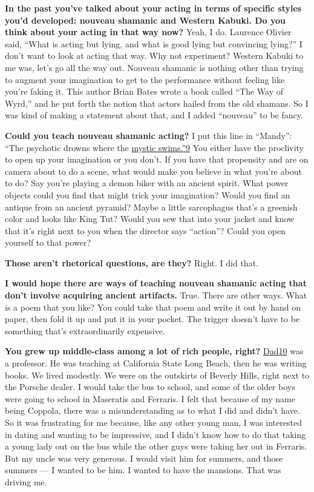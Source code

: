 \textbf{In the past you've talked about your acting in terms of specific
styles you'd developed: nouveau shamanic and Western Kabuki. Do you
think about your acting in that way now?} Yeah, I do. Laurence Olivier
said, ``What is acting but lying, and what is good lying but convincing
lying?'' I don't want to look at acting that way. Why not experiment?
Western Kabuki to me was, let's go all the way out. Nouveau shamanic is
nothing other than trying to augment your imagination to get to the
performance without feeling like you're faking it. This author Brian
Bates wrote a book called ``The Way of Wyrd,'' and he put forth the
notion that actors hailed from the old shamans. So I was kind of making
a statement about that, and I added ``nouveau'' to be fancy.

\textbf{Could you teach nouveau shamanic acting?} I put this line in
``Mandy'': ``The psychotic drowns where the
\href{http://nytimes3xbfgragh.onion\#tooltip-9}{mystic
swims.''}\href{http://nytimes3xbfgragh.onion\#tooltip-9}{9} You either
have the proclivity to open up your imagination or you don't. If you
have that propensity and are on camera about to do a scene, what would
make you believe in what you're about to do? Say you're playing a demon
biker with an ancient spirit. What power objects could you find that
might trick your imagination? Would you find an antique from an ancient
pyramid? Maybe a little sarcophagus that's a greenish color and looks
like King Tut? Would you sew that into your jacket and know that it's
right next to you when the director says ``action''? Could you open
yourself to that power?

\textbf{Those aren't rhetorical questions, are they?} Right. I did that.

\textbf{I would hope there are ways of teaching nouveau shamanic acting
that don't involve acquiring ancient artifacts.} True. There are other
ways. What is a poem that you like? You could take that poem and write
it out by hand on paper, then fold it up and put it in your pocket. The
trigger doesn't have to be something that's extraordinarily expensive.

\textbf{You grew up middle-class among a lot of rich people, right?}
\href{http://nytimes3xbfgragh.onion\#tooltip-10}{Dad}\href{http://nytimes3xbfgragh.onion\#tooltip-10}{10}
was a professor. He was teaching at California State Long Beach, then he
was writing books. We lived modestly. We were on the outskirts of
Beverly Hills, right next to the Porsche dealer. I would take the bus to
school, and some of the older boys were going to school in Maseratis and
Ferraris. I felt that because of my name being Coppola, there was a
misunderstanding as to what I did and didn't have. So it was frustrating
for me because, like any other young man, I was interested in dating and
wanting to be impressive, and I didn't know how to do that taking a
young lady out on the bus while the other guys were taking her out in
Ferraris. But my uncle was very generous. I would visit him for summers,
and those summers --- I wanted to be him. I wanted to have the mansions.
That was driving me.

